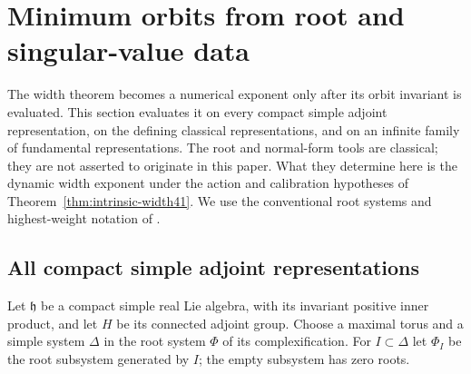 \section{Minimum orbits from root and singular-value data}\label{sec:minima41}
The width theorem becomes a numerical exponent only after its orbit
invariant is evaluated. This section evaluates it on every compact simple
adjoint representation, on the defining classical representations, and
on an infinite family of fundamental representations. The root and
normal-form tools are classical; they are not asserted to originate in
this paper. What they determine here is the dynamic width exponent under
the action and calibration hypotheses of
Theorem~\ref{thm:intrinsic-width41}. We use the conventional root systems
and highest-weight notation of \cite[Sections 21--23, 27, 30--32]{Etingof}.

\subsection{All compact simple adjoint representations}
Let $\mathfrak h$ be a compact simple real Lie algebra, with its invariant
positive inner product, and let $H$ be its connected adjoint group.
Choose a maximal torus and a simple system $\Delta$ in the root system
$\Phi$ of its complexification. For $I\subset\Delta$ let $\Phi_I$ be the
root subsystem generated by $I$; the empty subsystem has zero roots.

